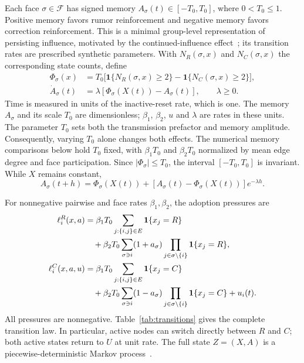 \documentclass[final,5p,times,twocolumn,sort&compress]{elsarticle}
\theoremstyle{plain}
\newcommand{\ind}{\mathbf{1}}
\newcommand{\Fset}{\mathcal{F}}
\begin{document}
Each face $\sigma\in\Fset$ has signed memory $A_\sigma(t)\in[-T_0,T_0]$, where $0<T_0\le1$. Positive memory favors rumor reinforcement and negative memory favors correction reinforcement. This is a minimal group-level representation of persisting influence, motivated by the continued-influence effect~\cite{lewandowsky2012}; its transition rates are prescribed synthetic parameters. With $N_R(\sigma,x)$ and $N_C(\sigma,x)$ the corresponding state counts, define
\begin{align}
 \Phi_\sigma(x)&=T_0\big[\ind\{N_R(\sigma,x)\ge2\}
                      -\ind\{N_C(\sigma,x)\ge2\}\big],\label{eq:drive}\\
 \dot A_\sigma(t)&=\lambda[\Phi_\sigma(X(t))-A_\sigma(t)],
 \qquad \lambda\ge0.\label{eq:memory}
\end{align}
Time is measured in units of the inactive-reset rate, which is one. The memory $A_\sigma$ and its scale $T_0$ are dimensionless; $\beta_1$, $\beta_2$, $u$ and $\lambda$ are rates in these units. The parameter $T_0$ sets both the transmission prefactor and memory amplitude. Consequently, varying $T_0$ alone changes both effects. The numerical memory comparisons below hold $T_0$ fixed, with $\beta_1T_0$ and $\beta_2T_0$ normalized by mean edge degree and face participation. Since $|\Phi_\sigma|\le T_0$, the interval $[-T_0,T_0]$ is invariant. While $X$ remains constant,
\begin{equation}
 A_\sigma(t+h)=\Phi_\sigma(X(t))+
 [A_\sigma(t)-\Phi_\sigma(X(t))]e^{-\lambda h}.\label{eq:flow}
\end{equation}

For nonnegative pairwise and face rates $\beta_1,\beta_2$, the adoption pressures are
\begin{align}
 \ell_i^R(x,a)&=\beta_1T_0\sum_{j:\{i,j\}\in E}\ind\{x_j=R\}\notag\\
 &\quad+\beta_2T_0\sum_{\sigma\ni i}(1+a_\sigma)
       \prod_{j\in\sigma\setminus\{i\}}\ind\{x_j=R\},\label{eq:rumor}\\
 \ell_i^C(x,a,u)&=\beta_1T_0\sum_{j:\{i,j\}\in E}\ind\{x_j=C\}\notag\\
 &\quad+\beta_2T_0\sum_{\sigma\ni i}(1-a_\sigma)
       \prod_{j\in\sigma\setminus\{i\}}\ind\{x_j=C\}+u_i(t).
 \label{eq:correction}
\end{align}
All pressures are nonnegative. Table~\ref{tab:transitions} gives the complete transition law. In particular, active nodes can switch directly between $R$ and $C$; both active states return to $U$ at unit rate. The full state $Z=(X,A)$ is a piecewise-deterministic Markov process~\cite{davis1984}.
\end{document}
